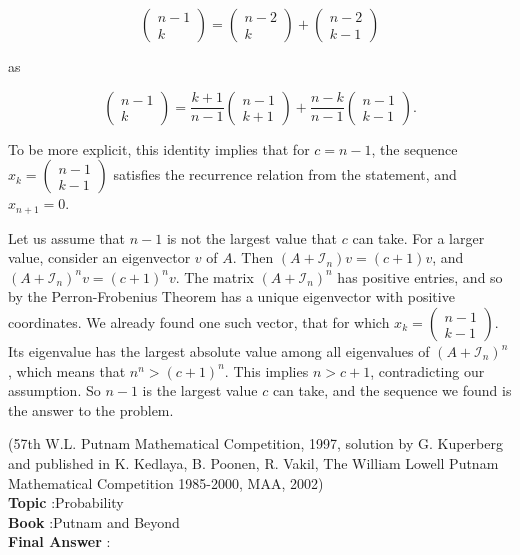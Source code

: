 \documentclass[10pt]{article}
\begin{document}
$$
\left(\begin{array}{c}
n-1 \\
k
\end{array}\right)=\left(\begin{array}{c}
n-2 \\
k
\end{array}\right)+\left(\begin{array}{l}
n-2 \\
k-1
\end{array}\right)
$$

as

$$
\left(\begin{array}{c}
n-1 \\
k
\end{array}\right)=\frac{k+1}{n-1}\left(\begin{array}{c}
n-1 \\
k+1
\end{array}\right)+\frac{n-k}{n-1}\left(\begin{array}{l}
n-1 \\
k-1
\end{array}\right) .
$$

To be more explicit, this identity implies that for $c=n-1$, the sequence $x_{k}=\left(\begin{array}{l}n-1 \\ k-1\end{array}\right)$ satisfies the recurrence relation from the statement, and $x_{n+1}=0$.

Let us assume that $n-1$ is not the largest value that $c$ can take. For a larger value, consider an eigenvector $v$ of $A$. Then $\left(A+\mathcal{I}_{n}\right) v=(c+1) v$, and $\left(A+\mathcal{I}_{n}\right)^{n} v=(c+1)^{n} v$. The matrix $\left(A+\mathcal{I}_{n}\right)^{n}$ has positive entries, and so by the Perron-Frobenius Theorem has a unique eigenvector with positive coordinates. We already found one such vector, that for which $x_{k}=\left(\begin{array}{c}n-1 \\ k-1\end{array}\right)$. Its eigenvalue has the largest absolute value among all eigenvalues of $\left(A+\mathcal{I}_{n}\right)^{n}$, which means that $n^{n}>(c+1)^{n}$. This implies $n>c+1$, contradicting our assumption. So $n-1$ is the largest value $c$ can take, and the sequence we found is the answer to the problem.

(57th W.L. Putnam Mathematical Competition, 1997, solution by G. Kuperberg and published in K. Kedlaya, B. Poonen, R. Vakil, The William Lowell Putnam Mathematical Competition 1985-2000, MAA, 2002)
\\
\textbf{Topic} :Probability\\
\textbf{Book} :Putnam and Beyond\\
\textbf{Final Answer} :\\
\end{document}
